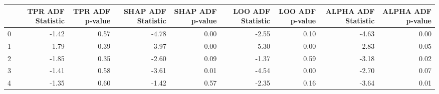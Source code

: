 \begin{tabular}{lrrrrrrrr}
\toprule
 & TPR ADF Statistic & TPR ADF p-value & SHAP ADF Statistic & SHAP ADF p-value & LOO ADF Statistic & LOO ADF p-value & ALPHA ADF Statistic & ALPHA ADF p-value \\
\midrule
0 & -1.42 & 0.57 & -4.78 & 0.00 & -2.55 & 0.10 & -4.63 & 0.00 \\
1 & -1.79 & 0.39 & -3.97 & 0.00 & -5.30 & 0.00 & -2.83 & 0.05 \\
2 & -1.85 & 0.35 & -2.60 & 0.09 & -1.37 & 0.59 & -3.18 & 0.02 \\
3 & -1.41 & 0.58 & -3.61 & 0.01 & -4.54 & 0.00 & -2.70 & 0.07 \\
4 & -1.35 & 0.60 & -1.42 & 0.57 & -2.35 & 0.16 & -3.64 & 0.01 \\
\bottomrule
\end{tabular}
